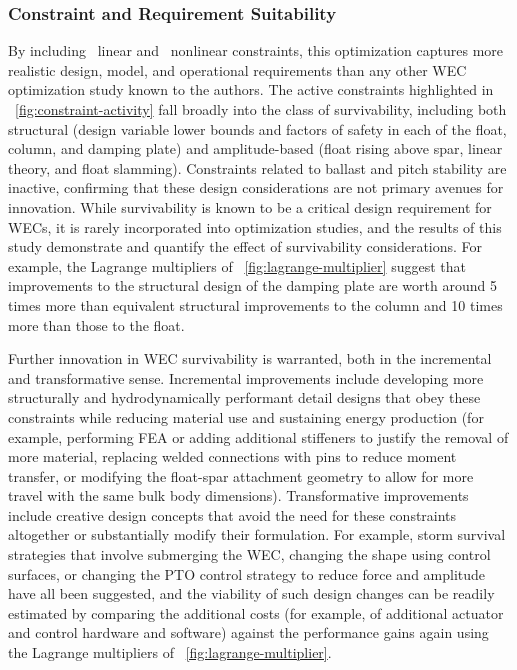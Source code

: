 \subsubsection{Constraint and Requirement Suitability}
By including \numLinConstraints~linear and \numNonlinConstraints~nonlinear constraints, this optimization captures more realistic design, model, and operational requirements than any other WEC optimization study known to the authors.
The active constraints highlighted in \figureautorefname~\ref{fig:constraint-activity} fall broadly into the class of survivability, including both structural (design variable lower bounds and factors of safety in each of the float, column, and damping plate) and amplitude-based (float rising above spar, linear theory, and float slamming). 
Constraints related to ballast and pitch stability are inactive, confirming that these design considerations are not primary avenues for innovation.
While survivability is known to be a critical design requirement for WECs, it is rarely incorporated into optimization studies, and the results of this study demonstrate and quantify the effect of survivability considerations. 
For example, the Lagrange multipliers of \figureautorefname~\ref{fig:lagrange-multiplier} suggest that improvements to the structural design of the damping plate are worth around 5 times more than equivalent structural improvements to the column and 10 times more than those to the float.

Further innovation in WEC survivability is warranted, both in the incremental and transformative sense.
Incremental improvements include developing more structurally and hydrodynamically performant detail designs that obey these constraints while reducing material use and sustaining energy production (for example, performing FEA or adding additional stiffeners to justify the removal of more material, replacing welded connections with pins to reduce moment transfer, or modifying the float-spar attachment geometry to allow for more travel with the same bulk body dimensions).
Transformative improvements include creative design concepts that avoid the need for these constraints altogether or substantially modify their formulation.
For example, storm survival strategies that involve submerging the WEC, changing the shape using control surfaces, or changing the PTO control strategy to reduce force and amplitude have all been suggested, and the viability of such design changes can be readily estimated by comparing the additional costs (for example, of additional actuator and control hardware and software) against the performance gains again using the Lagrange multipliers of \figureautorefname~\ref{fig:lagrange-multiplier}.

